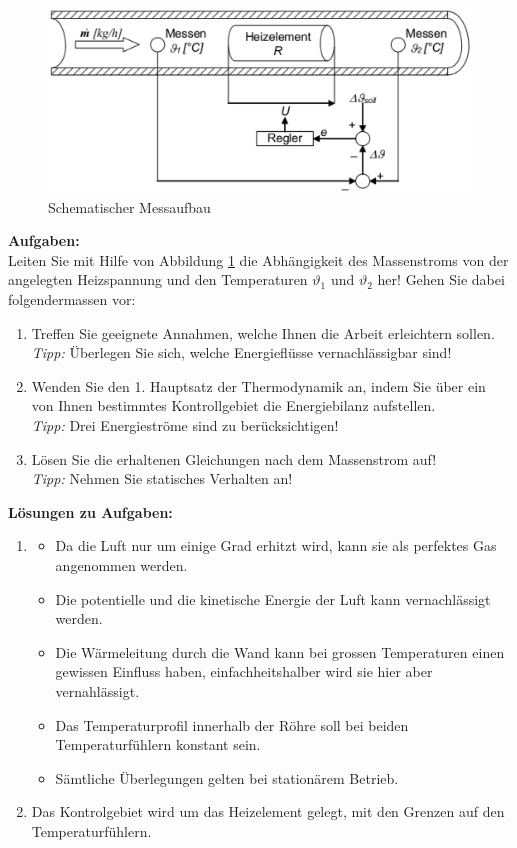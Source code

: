 \documentclass[a4paper,10pt,oneside]{article}
\begin{document}
\begin{figure}[H]
\centering
\includegraphics[width=\textwidth]{img/schema_luft.eps}
\caption{Schematischer Messaufbau}
\label{schemaaufbau}
\end{figure}
\newpage

\textbf{Aufgaben:} \\
Leiten Sie mit Hilfe von Abbildung \ref{schemaaufbau} die Abhängigkeit des Massenstroms von der angelegten Heizspannung und den Temperaturen $\vartheta_1$ und $\vartheta_2$ her!
Gehen Sie dabei folgendermassen vor:

\begin{enumerate}
\item Treffen Sie geeignete Annahmen, welche Ihnen die Arbeit erleichtern sollen.\\ \textit{Tipp:} Überlegen Sie sich, welche Energieflüsse vernachlässigbar sind!
\item Wenden Sie den 1. Hauptsatz der Thermodynamik an, indem Sie über ein von Ihnen bestimmtes Kontrollgebiet die Energiebilanz aufstellen.\\ \textit{Tipp:} Drei Energieströme sind zu berücksichtigen!
\item Lösen Sie die erhaltenen Gleichungen nach dem Massenstrom auf!\\ \textit{Tipp:} Nehmen Sie statisches Verhalten an!\\
\end{enumerate}


\textbf{Lösungen zu Aufgaben:}

\begin{enumerate}
\item \begin{itemize} \item Da die Luft nur um einige Grad erhitzt wird, kann sie als perfektes Gas angenommen werden. \item Die potentielle und die kinetische Energie der Luft kann vernachlässigt werden. \item Die Wärmeleitung durch die Wand kann bei grossen Temperaturen einen gewissen Einfluss haben, einfachheitshalber wird sie hier aber vernahlässigt. \item Das Temperaturprofil innerhalb der Röhre soll bei beiden Temperaturfühlern konstant sein. \item Sämtliche Überlegungen gelten bei stationärem Betrieb. \end{itemize}
\item Das Kontrolgebiet wird um das Heizelement gelegt, mit den Grenzen auf den Temperaturfühlern.
\end{enumerate}
\end{document}
